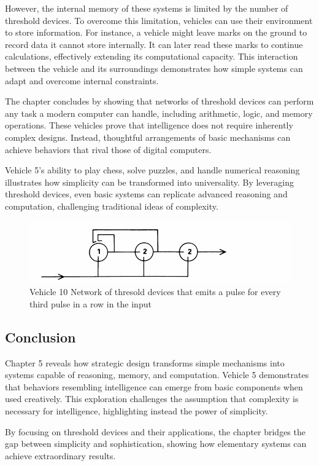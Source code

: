 \documentclass{article}
\begin{document}
    However, the internal memory of these systems is limited by the number of threshold devices. To overcome this limitation, vehicles can use their environment to store information. For instance, a vehicle might leave marks on the ground to record data it cannot store internally. It can later read these marks to continue calculations, effectively extending its computational capacity. This interaction between the vehicle and its surroundings demonstrates how simple systems can adapt and overcome internal constraints. 
	

    The chapter concludes by showing that networks of threshold devices can perform any task a modern computer can handle, including arithmetic, logic, and memory operations. These vehicles prove that intelligence does not require inherently complex designs. Instead, thoughtful arrangements of basic mechanisms can achieve behaviors that rival those of digital computers.  

    Vehicle 5's ability to play chess, solve puzzles, and handle numerical reasoning illustrates how simplicity can be transformed into universality. By leveraging threshold devices, even basic systems can replicate advanced reasoning and computation, challenging traditional ideas of complexity.


	\begin{figure}[h]
		\centering
		\includegraphics[scale=0.6]{images/figure_10b.png}
		\caption{Vehicle 10 Network of thresold devices that emits a pulse for every third pulse in a row in the input}
		\label{fig:vehicle-10b}
	\end{figure}

    \subsection*{Conclusion}
    Chapter 5 reveals how strategic design transforms simple mechanisms into systems capable of reasoning, memory, and computation. Vehicle 5 demonstrates that behaviors resembling intelligence can emerge from basic components when used creatively. This exploration challenges the assumption that complexity is necessary for intelligence, highlighting instead the power of simplicity.  

    By focusing on threshold devices and their applications, the chapter bridges the gap between simplicity and sophistication, showing how elementary systems can achieve extraordinary results.
	
\end{document}
